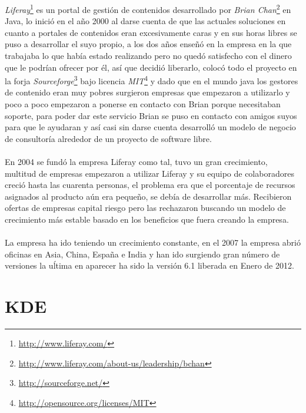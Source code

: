 \documentclass[a4paper,oneside,11pt]{article}
\begin{document}
\emph{Liferay}\footnote{\url{http://www.liferay.com/}} es un portal de gesti\'on de contenidos desarrollado por \emph{Brian Chan}\footnote{\url{http://www.liferay.com/about-us/leadership/bchan}} en Java, lo inici\'o en el año 2000 al darse cuenta de que 
las actuales soluciones en cuanto a portales de contenidos eran excesivamente caras y en sus horas libres se puso a desarrollar el
suyo propio, a los dos años enseñ\'o en la empresa en la que trabajaba lo que hab\'ia estado realizando pero no qued\'o satisfecho
con el dinero que le podr\'ian ofrecer por \'el, as\'i que decidi\'o liberarlo, coloc\'o todo el proyecto en la forja \emph{Sourceforge}\footnote{\url{http://sourceforge.net/}} bajo 
licencia \emph{MIT}\footnote{\url{http://opensource.org/licenses/MIT}} y dado que en el mundo java los gestores de contenido eran muy pobres surgieron empresas que empezaron a utilizarlo y poco
a poco empezaron a ponerse en contacto con Brian porque necesitaban soporte, para poder dar este servicio Brian se puso en contacto
con amigos suyos para que le ayudaran y as\'i casi sin darse cuenta desarroll\'o un modelo de negocio de consultor\'ia alrededor de
un proyecto de software libre.
\\\\
En 2004 se fund\'o la empresa Liferay como tal, tuvo un gran crecimiento, multitud de empresas empezaron a utilizar Liferay y
su equipo de colaboradores creci\'o hasta las cuarenta personas, el problema era que el porcentaje de recursos asignados al
producto a\'un era pequeño, se deb\'ia de desarrollar m\'as. Recibieron ofertas de empresas capital riesgo pero las rechazaron buscando
un modelo de crecimiento m\'as estable basado en los beneficios que fuera creando la empresa.
\\\\
La empresa ha ido teniendo un crecimiento constante, en el 2007 la empresa abri\'o oficinas en Asia, China, España e India y han ido
surgiendo gran n\'umero de versiones la u\'ltima en aparecer ha sido la versi\'on 6.1 liberada en Enero de 2012.

\section{KDE}
\end{document}
